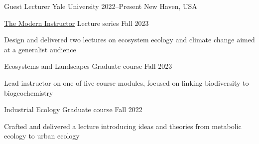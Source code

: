 

\begin{cventries}

  \cventry
    {Guest Lecturer} %
    {Yale University} %
    {2022--Present} %
    {New Haven, USA} %
    {
      \begin{cvsubentries}
       \cvsubentry
        {\href{https://ypa.yale.edu/skills-and-career-development/modern-instructor}{The Modern Instructor}}
        {\footnotesize Lecture series}
        {Fall 2023}
        {
         \begin{cvitems}
          \item Design and delivered two lectures on ecosystem ecology and climate change aimed at a generalist audience
         \end{cvitems} 
        }
       \cvsubentry
        {Ecosystems and Landscapes}
        {\footnotesize Graduate course}
        {Fall 2023}
        {
         \begin{cvitems}
          \item Lead instructor on one of five course modules, focused on linking biodiversity to biogeochemistry
         \end{cvitems} 
        }
       \cvsubentry
         {Industrial Ecology}
         {\footnotesize Graduate course}
         {Fall 2022}
         {
         \begin{cvitems}
          \item Crafted and delivered a lecture introducing ideas and theories from metabolic ecology to urban ecology
         \end{cvitems} 
         }
      \end{cvsubentries}
    }


\end{cventries}
